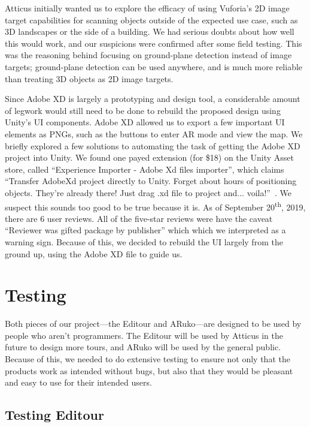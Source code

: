 \documentclass[a4paper, 10pt, american, titlepage]{article}
\begin{document}
Atticus initially wanted us to explore the efficacy of using Vuforia's 2D image
target capabilities for scanning objects outside of the expected use case, such
as 3D landscapes or the side of a building. We had serious doubts about how
well this would work, and our suspicions were confirmed after some field
testing. This was the reasoning behind focusing on ground-plane detection
instead of image targets; ground-plane detection can be used anywhere, and is
much more reliable than treating 3D objects as 2D image targets.

Since Adobe XD is largely a prototyping and design tool, a considerable amount
of legwork would still need to be done to rebuild the proposed design using
Unity's UI components. Adobe XD allowed us to export a few important UI
elements as PNGs, such as the buttons to enter AR mode and view the map. We
briefly explored a few solutions to automating the task of getting the Adobe XD
project into Unity. We found one payed extension (for \$18) on the Unity Asset
store, called ``Experience Importer - Adobe Xd files importer'', which claims
``Transfer AdobeXd project directly to Unity. Forget about hours of positioning
objects. They're already there! Just drag .xd file to project and...
voila!''~\autocite{glasseye2019}.  We suspect this sounds too good to be true
because it is. As of September 20\textsuperscript{th}, 2019, there are 6 user
reviews. All of the five-star reviews were have the caveat ``Reviewer was gifted
package by publisher'' which which we interpreted as a warning sign. Because of
this, we decided to rebuild the UI largely from the ground up, using the Adobe XD
file to guide us.

\clearpage

\section{Testing}
\label{sec:testing}

Both pieces of our project---the Editour and ARuko---are designed to be used by
people who aren't programmers. The Editour will be used by Atticus in the future
to design more tours, and ARuko will be used by the general public. Because of
this, we needed to do extensive testing to ensure not only that the products
work as intended without bugs, but also that they would be pleasant and easy to
use for their intended users.

\nocite{harvey2002} %

\subsection{Testing Editour}
\label{sec:testingEditour}
\end{document}
